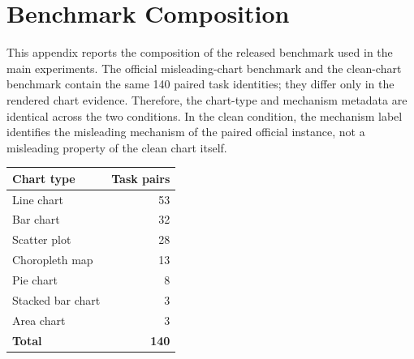 \documentclass[11pt]{article}
\begin{document}
\section{Benchmark Composition}
\label{app:benchmark-composition}

This appendix reports the composition of the released benchmark used in the main experiments. The official misleading-chart benchmark and the clean-chart benchmark contain the same 140 paired task identities; they differ only in the rendered chart evidence. Therefore, the chart-type and mechanism metadata are identical across the two conditions. In the clean condition, the mechanism label identifies the misleading mechanism of the paired official instance, not a misleading property of the clean chart itself.

\begin{center}
\begin{minipage}{\columnwidth}
\centering
\small
\setlength{\tabcolsep}{6pt}
\renewcommand{\arraystretch}{1.08}
\begin{tabular}{lr}
\toprule
\textbf{Chart type} & \textbf{Task pairs} \\
\midrule
Line chart & 53 \\
Bar chart & 32 \\
Scatter plot & 28 \\
Choropleth map & 13 \\
Pie chart & 8 \\
Stacked bar chart & 3 \\
Area chart & 3 \\
\midrule
\textbf{Total} & \textbf{140} \\
\bottomrule
\end{tabular}
\label{tab:app-chart-type-composition}
\end{minipage}
\end{center}
\end{document}
